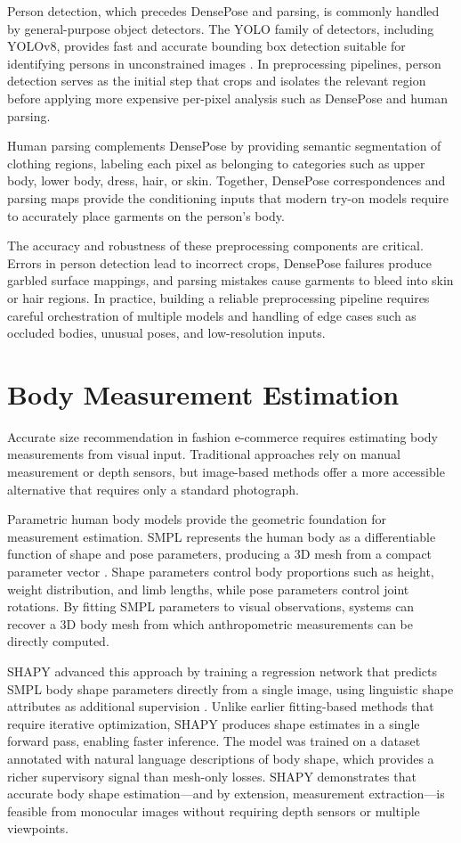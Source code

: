Person detection, which precedes DensePose and parsing, is commonly handled by general-purpose object detectors. The YOLO family of detectors, including YOLOv8, provides fast and accurate bounding box detection suitable for identifying persons in unconstrained images \cite{redmon2016yolo,jocher2023yolov8}. In preprocessing pipelines, person detection serves as the initial step that crops and isolates the relevant region before applying more expensive per-pixel analysis such as DensePose and human parsing.

Human parsing complements DensePose by providing semantic segmentation of clothing regions, labeling each pixel as belonging to categories such as upper body, lower body, dress, hair, or skin. Together, DensePose correspondences and parsing maps provide the conditioning inputs that modern try-on models require to accurately place garments on the person's body.

The accuracy and robustness of these preprocessing components are critical. Errors in person detection lead to incorrect crops, DensePose failures produce garbled surface mappings, and parsing mistakes cause garments to bleed into skin or hair regions. In practice, building a reliable preprocessing pipeline requires careful orchestration of multiple models and handling of edge cases such as occluded bodies, unusual poses, and low-resolution inputs.

\section{Body Measurement Estimation}
Accurate size recommendation in fashion e-commerce requires estimating body measurements from visual input. Traditional approaches rely on manual measurement or depth sensors, but image-based methods offer a more accessible alternative that requires only a standard photograph.

Parametric human body models provide the geometric foundation for measurement estimation. SMPL represents the human body as a differentiable function of shape and pose parameters, producing a 3D mesh from a compact parameter vector \cite{loper2015smpl}. Shape parameters control body proportions such as height, weight distribution, and limb lengths, while pose parameters control joint rotations. By fitting SMPL parameters to visual observations, systems can recover a 3D body mesh from which anthropometric measurements can be directly computed.

SHAPY advanced this approach by training a regression network that predicts SMPL body shape parameters directly from a single image, using linguistic shape attributes as additional supervision \cite{choutas2022shapy}. Unlike earlier fitting-based methods that require iterative optimization, SHAPY produces shape estimates in a single forward pass, enabling faster inference. The model was trained on a dataset annotated with natural language descriptions of body shape, which provides a richer supervisory signal than mesh-only losses. SHAPY demonstrates that accurate body shape estimation—and by extension, measurement extraction—is feasible from monocular images without requiring depth sensors or multiple viewpoints.

